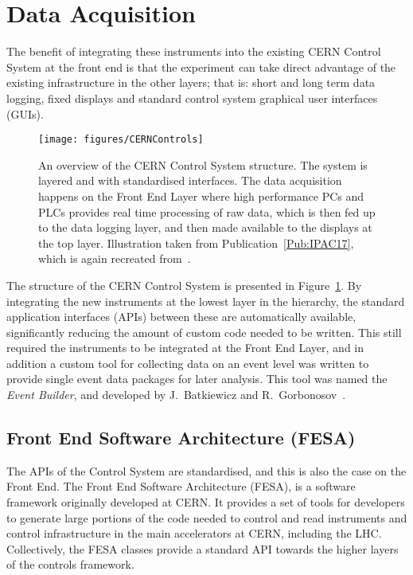 \section{Data Acquisition}
\label{DAQ:DAQ}

The benefit of integrating these instruments into the existing CERN Control System at the front end is that the experiment can take direct advantage of the existing infrastructure in the other layers; that is: short and long term data logging, fixed displays and standard control system graphical user interfaces (GUIs).

\begin{figure}[hbt]
    \centering
    \texttt{[image: figures/CERNControls]}
    \caption{\label{Fig:DAQ:CERN}
        An overview of the CERN Control System structure.
        The system is layered and with standardised interfaces.
        The data acquisition happens on the Front End Layer where high performance PCs and PLCs provides real time processing of raw data, which is then fed up to the data logging layer, and then made available to the displays at the top layer.
        Illustration taken from Publication~\ref{Pub:IPAC17}, which is again recreated from~\cite{add:gorbonosov:2013}.
    }
\end{figure}

The structure of the CERN Control System is presented in Figure~\ref{Fig:DAQ:CERN}.
By integrating the new instruments at the lowest layer in the hierarchy, the standard application interfaces (APIs) between these are automatically available, significantly reducing the amount of custom code needed to be written.
This still required the instruments to be integrated at the Front End Layer, and in addition a custom tool for collecting data on an event level was written to provide single event data packages for later analysis.
This tool was named the \textit{Event Builder}, and developed by J.~Batkiewicz and R.~Gorbonosov~\cite{add:gessner:2018}.

\subsection{Front End Software Architecture (FESA)}
\label{DAQ:FESA}

The APIs of the Control System are standardised, and this is also the case on the Front End.
The Front End Software Architecture (FESA), is a software framework originally developed at CERN.
It provides a set of tools for developers to generate large portions of the code needed to control and read instruments and control infrastructure in the main accelerators at CERN, including the LHC.
Collectively, the FESA classes provide a standard API towards the higher layers of the controls framework.

